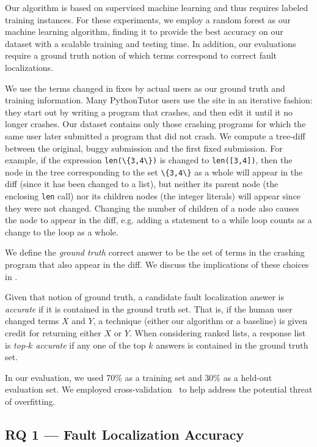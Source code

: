 \documentclass[conference]{IEEEtran}
\newcommand\lt[1]{{\lstinline|#1|}}
\begin{document}
Our algorithm is based on supervised machine learning and thus requires
labeled training instances.  For these experiments, we employ a random
forest as our machine learning algorithm, finding it to provide the best
accuracy on our dataset with a scalable training and testing time.  In
addition, our evaluations require a ground truth notion of which terms
correspond to correct fault localizations.

We use the terms changed in fixes by actual users as our
ground truth and training information.  Many PythonTutor users use the site
in an iterative fashion: they start out by writing a program that crashes,
and then edit it until it no longer crashes. Our dataset contains only
those crashing programs for which the same user later submitted a program
that did not crash. We compute a tree-diff~\cite{tree-diff} between the
original, buggy submission and the first fixed submission. For example,
if the expression \lt{len(\{3,4\})} is changed to \lt{len([3,4])}, then the
node in the tree corresponding to the set \lt{\{3,4\}} as a whole will
appear in the diff (since it has been changed to a list), but neither its parent
node (the enclosing \lt{len} call) nor its children nodes (the integer literals)
will appear since they were not changed. Changing the number of children of a
node also causes the node to appear in the diff, e.g. adding a statement
to a while loop counts as a change to the loop as a whole.

We define the \emph{ground truth} correct answer to be the set of terms in the
crashing program that also appear in the diff. We discuss the implications
of these choices in .

Given that notion of ground truth, a candidate fault localization answer is
\emph{accurate} if it is contained in the ground truth set. That is, if the
human user changed terms $X$ and $Y$, a technique (either our algorithm
or a baseline) is given credit for returning either $X$ or $Y$. When
considering ranked lists, a response list is \emph{top-$k$ accurate} if any one
of the top $k$ answers is contained in the ground truth set.

In our evaluation, we used 70\% as a training set and 30\% as a held-out
evaluation set. We employed cross-validation~\cite{kohavi} to help address
the potential threat of overfitting.

\subsection{RQ 1 --- Fault Localization Accuracy}
\end{document}
